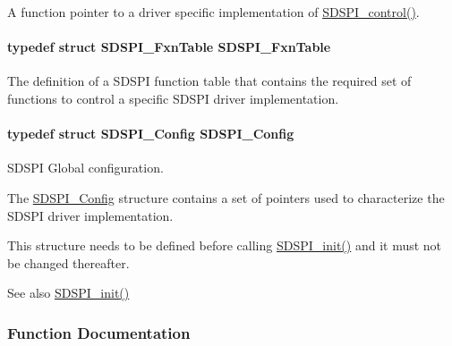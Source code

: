 A function pointer to a driver specific implementation of \hyperlink{_s_d_s_p_i_8h_a541a1db109382fe090ed7a9209a34f61}{S\+D\+S\+P\+I\+\_\+control()}. 

\paragraph[{S\+D\+S\+P\+I\+\_\+\+Fxn\+Table}]{\setlength{\rightskip}{0pt plus 5cm}typedef struct {\bf S\+D\+S\+P\+I\+\_\+\+Fxn\+Table}  {\bf S\+D\+S\+P\+I\+\_\+\+Fxn\+Table}}\label{_s_d_s_p_i_8h_a5d2665a5c69ea532a94acdc45ac1f456}


The definition of a S\+D\+S\+P\+I function table that contains the required set of functions to control a specific S\+D\+S\+P\+I driver implementation. 

\paragraph[{S\+D\+S\+P\+I\+\_\+\+Config}]{\setlength{\rightskip}{0pt plus 5cm}typedef struct {\bf S\+D\+S\+P\+I\+\_\+\+Config}  {\bf S\+D\+S\+P\+I\+\_\+\+Config}}\label{_s_d_s_p_i_8h_acd04506a18457faefc4f3639b6e0a0a1}


S\+D\+S\+P\+I Global configuration. 

The \hyperlink{struct_s_d_s_p_i___config}{S\+D\+S\+P\+I\+\_\+\+Config} structure contains a set of pointers used to characterize the S\+D\+S\+P\+I driver implementation.

This structure needs to be defined before calling \hyperlink{_s_d_s_p_i_8h_a83cfcebe7875d9d8b5e08e57e6785ae6}{S\+D\+S\+P\+I\+\_\+init()} and it must not be changed thereafter.

\begin{DoxySeeAlso}{See also}
\hyperlink{_s_d_s_p_i_8h_a83cfcebe7875d9d8b5e08e57e6785ae6}{S\+D\+S\+P\+I\+\_\+init()} 
\end{DoxySeeAlso}


\subsubsection{Function Documentation}
